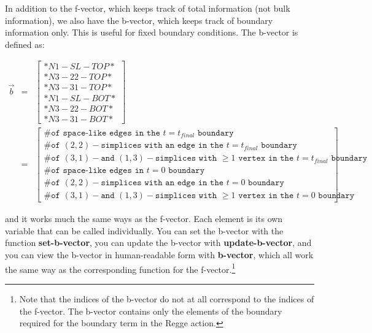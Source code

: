 \documentclass[12pt]{article}
\begin{document}
In addition to the f-vector, which keeps track of total information
(not bulk information), we also have the b-vector, which keeps track
of boundary information only. This is useful for fixed boundary
conditions. The b-vector is defined as:
\begin{small}
\begin{eqnarray}
  \vec{b}&=&\left[\begin{array}{c}\texttt{*}N1-SL-TOP*\\
      \texttt{*}N3-22-TOP*\\\texttt{*}N3-31-TOP*\\
      \texttt{*}N1-SL-BOT* \\\texttt{*}N3-22-BOT*\\ 
      \texttt{*}N3-31-BOT*\end{array}\right]\nonumber\\
  &=&\left[\begin{array}{c}\texttt{\# of space-like edges in the }t=t_{final}\texttt{ boundary}\\
      \texttt{\# of }(2,2)-\texttt{simplices with an edge in the }t=t_{final}\texttt{ boundary}\\
      \texttt{\# of }(3,1)-\texttt{and }(1,3)-\texttt{simplices with }\geq 1\texttt{ vertex in the }t=t_{final}\texttt{ boundary}\\
      \texttt{\# of space-like edges in } t=0\texttt{ boundary}\\
      \texttt{\# of }(2,2)-\texttt{simplices with an edge in the }t=0\texttt{ boundary}\\
      \texttt{\# of }(3,1)-\texttt{and }(1,3)-\texttt{simplices with }\geq 1\texttt{ vertex in the }t=0\texttt{ boundary}\end{array}\right]\nonumber
\end{eqnarray}
\end{small}
and it works much the same ways as the f-vector. Each element is its
own variable that can be called individually. You can set the b-vector
with the function \textbf{set-b-vector}, you can update the b-vector
with \textbf{update-b-vector}, and you can view the b-vector in
human-readable form with \textbf{b-vector}, which all work the same
way as the corresponding function for the f-vector.\footnote{Note that the indices of the b-vector do
  not at all correspond to the indices of the f-vector. The b-vector
  contains only the elements of the boundary required for the boundary
  term in the Regge action.}
\end{document}
